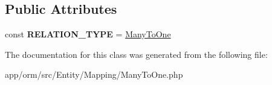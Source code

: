 \subsection*{Public Attributes}
\begin{DoxyCompactItemize}
\item 
const {\bfseries R\+E\+L\+A\+T\+I\+O\+N\+\_\+\+T\+Y\+PE} = \textquotesingle{}\hyperlink{classORM_1_1Entity_1_1Mapping_1_1ManyToOne}{Many\+To\+One}\textquotesingle{}\hypertarget{classORM_1_1Entity_1_1Mapping_1_1ManyToOne_a01ce13e9e2e768ab3b6e33ce8a71dd32}{}\label{classORM_1_1Entity_1_1Mapping_1_1ManyToOne_a01ce13e9e2e768ab3b6e33ce8a71dd32}

\end{DoxyCompactItemize}


The documentation for this class was generated from the following file\+:\begin{DoxyCompactItemize}
\item 
app/orm/src/\+Entity/\+Mapping/Many\+To\+One.\+php\end{DoxyCompactItemize}

